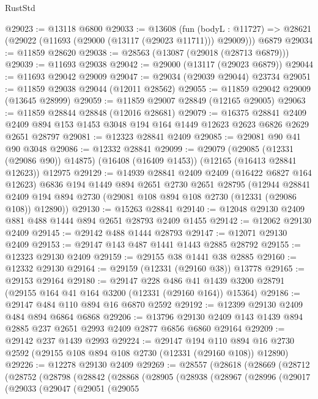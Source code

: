 \begin{lexlean}{RustStd}
\begin{coremodule}
@29023 := @13118 @6800
@29033 := @13608
    (fun (bodyL : @11727) => @28621 (@29022 (@11693 (@29000 (@13117 (@29023 @11711))) @29009)))
    @6879
@29034 := @11859 @28620
@29038 := @28563 (@13087 (@29018 (@28713 @6879)))
@29039 := @11693 @29038
@29042 := @29000 (@13117 (@29023 @6879))
@29044 := @11693 @29042 @29009
@29047 := @29034 (@29039 @29044) @23734
@29051 := @11859 @29038 @29044 (@12011 @28562)
@29055 := @11859 @29042 @29009 (@13645 @28999)
@29059 := @11859 @29007 @28849 (@12165 @29005)
@29063 := @11859 @28844 @28848 (@12016 @28681)
@29079 := @16375
    @28841
    @2409
    @2409
    @894
    @153
    @1453
    @3048
    @194
    @164
    @1449
    @12623
    @2623
    @6826
    @2629
    @2651
    @28797
@29081 := @12323 @28841 @2409
@29085 := @29081 @90 @41 @90 @3048
@29086 := @12332 @28841
@29099 := @29079
    (@29085 (@12331 (@29086 @90)) @14875)
    (@16408 (@16409 @1453))
    (@12165 (@16413 @28841 @12623))
    @12975
@29129 := @14939
    @28841
    @2409
    @2409
    (@16422 @6827 @164 @12623)
    @6836
    @194
    @1449
    @894
    @2651
    @2730
    @2651
    @28795
    (@12944
      @28841
      @2409
      @194
      @894
      @2730
      (@29081 @108 @894 @108 @2730 (@12331 (@29086 @108)) @12890))
@29130 := @15263 @28841
@29140 := @12048 @29130 @2409 @881 @488 @1444 @894 @2651 @28793 @2409 @1455
@29142 := @12062 @29130 @2409
@29145 := @29142 @488 @1444 @28793
@29147 := @12071 @29130 @2409
@29153 := @29147 @143 @487 @1441 @1443 @2885 @28792
@29155 := @12323 @29130 @2409
@29159 := @29155 @38 @1441 @38 @2885
@29160 := @12332 @29130
@29164 := @29159 (@12331 (@29160 @38)) @13778
@29165 := @29153 @29164
@29180 := @29147
    @228
    @486
    @41
    @1439
    @3200
    @28791
    (@29155 @164 @41 @164 @3200 (@12331 (@29160 @164)) @15364)
@29186 := @29147 @484 @110 @894 @16 @6870 @2592
@29192 := @12399 @29130 @2409 @484 @894 @6864 @6868
@29206 := @13796 @29130 @2409 @143 @1439 @894 @2885 @237 @2651 @2993 @2409 @2877 @6856 @6860 @29164
@29209 := @29142 @237 @1439 @2993
@29224 := @29147
    @194
    @110
    @894
    @16
    @2730
    @2592
    (@29155 @108 @894 @108 @2730 (@12331 (@29160 @108)) @12890)
@29226 := @12278 @29130 @2409
@29269 := @28557
    (@28618
      (@28669
        (@28712
          (@28752
            (@28798
              (@28842
                (@28868
                  (@28905
                    (@28938
                      (@28967
                        (@28996
                          (@29017
                            (@29033
                              (@29047
                                (@29051
                                  (@29055

\end{coremodule}
\end{lexlean}
